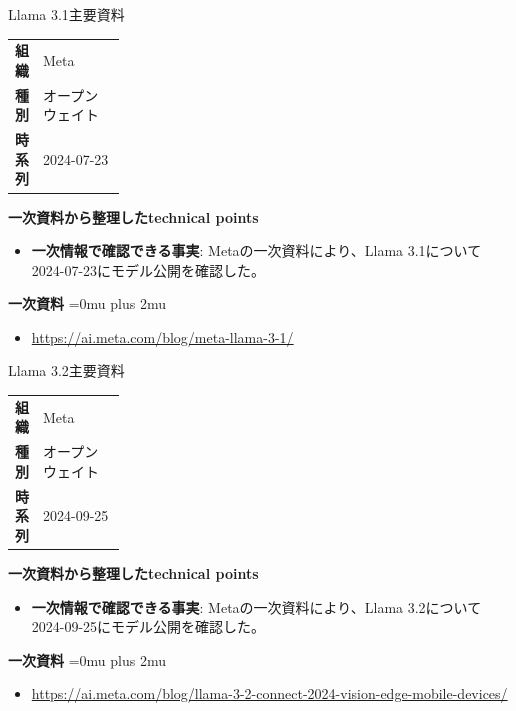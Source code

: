 \begin{technicalnote}{Llama 3.1}{主要資料}
\begingroup
\begin{tabularx}{\linewidth}{@{}>{\bfseries}p{0.22\linewidth}X@{}}
組織 & Meta \\
種別 & オープンウェイト \\
時系列 & 2024-07-23 \\
\end{tabularx}
\smallskip
{\bfseries 一次資料から整理したtechnical points}
\begin{itemize}[leftmargin=1.5em,itemsep=0.35em]
\item \textbf{一次情報で確認できる事実}: Metaの一次資料により、Llama 3.1について2024-07-23にモデル公開を確認した。
\end{itemize}
\begin{minipage}{\linewidth}
\begin{samepage}
{\bfseries 一次資料}
\begingroup\sloppy
\Urlmuskip=0mu plus 2mu\relax
\begin{itemize}[leftmargin=1.5em,itemsep=0.25em]
\item {\scriptsize\url{https://ai.meta.com/blog/meta-llama-3-1/}}
\end{itemize}
\endgroup
\end{samepage}
\end{minipage}
\endgroup
\end{technicalnote}
\medskip

\begin{technicalnote}{Llama 3.2}{主要資料}
\begingroup
\begin{tabularx}{\linewidth}{@{}>{\bfseries}p{0.22\linewidth}X@{}}
組織 & Meta \\
種別 & オープンウェイト \\
時系列 & 2024-09-25 \\
\end{tabularx}
\smallskip
{\bfseries 一次資料から整理したtechnical points}
\begin{itemize}[leftmargin=1.5em,itemsep=0.35em]
\item \textbf{一次情報で確認できる事実}: Metaの一次資料により、Llama 3.2について2024-09-25にモデル公開を確認した。
\end{itemize}
\begin{minipage}{\linewidth}
\begin{samepage}
{\bfseries 一次資料}
\begingroup\sloppy
\Urlmuskip=0mu plus 2mu\relax
\begin{itemize}[leftmargin=1.5em,itemsep=0.25em]
\item {\scriptsize\url{https://ai.meta.com/blog/llama-3-2-connect-2024-vision-edge-mobile-devices/}}
\end{itemize}
\endgroup
\end{samepage}
\end{minipage}
\endgroup
\end{technicalnote}
\medskip


